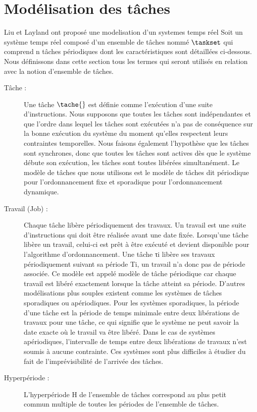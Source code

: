 \section{Modélisation des tâches}
\vspace{-1cm}
Liu et Layland \cite{LL73} ont proposé une modelisation d'un systemes temps réel 
Soit un système temps réel composé d’un ensemble de tâches nommé $\taskset$ qui comprend n tâches périodiques dont les caractéristiques sont détaillées ci-dessous. Nous définissons dans cette section tous les termes qui seront utilisés en relation avec la notion d’ensemble de tâches.
\begin{description}
\item[Tâche :] Une tâche $\tache{}$ est définie comme l’exécution d’une suite d’instructions. Nous supposons que toutes les tâches sont indépendantes et que l’ordre dans lequel les tâches sont exécutées n’a pas de conséquence sur la bonne exécution du système du moment qu’elles respectent leurs contraintes temporelles. Nous faisons également l’hypothèse que les tâches sont synchrones, donc que toutes les tâches sont actives dès que le système débute son exécution, les tâches sont toutes libérées simultanément. Le modèle de tâches que nous utilisons est le modèle de tâches dit périodique pour l’ordonnancement fixe et sporadique pour l’ordonnancement dynamique.
\item[Travail (Job) :] Chaque tâche libère périodiquement des travaux. Un travail est une suite d’instructions qui doit être réalisée avant une date fixée. Lorsqu’une tâche libère un travail, celui-ci est prêt à être exécuté et devient disponible pour l’algorithme d’ordonnancement. Une tâche τi libère ses travaux périodiquement suivant sa période Ti, un travail n’a donc pas de période associée. Ce modèle est appelé modèle de tâche périodique car chaque travail est libéré exactement lorsque la tâche atteint sa période. D’autres modélisations plus souples existent comme les systèmes de tâches sporadiques ou apériodiques. Pour les systèmes sporadiques, la période d’une tâche est la période de temps minimale entre deux libérations de travaux pour une tâche, ce qui signifie que le système ne peut savoir la date exacte où le travail va être libéré. Dans le cas de systèmes apériodiques, l’intervalle de temps entre deux libérations de travaux n’est soumis à aucune contrainte. Ces systèmes sont plus diﬃciles à étudier du fait de l’imprévisibilité de l’arrivée des tâches. 
\item[Hyperpériode :] L’hyperpériode H de l’ensemble de tâches correspond au plus petit commun multiple de toutes les périodes de l’ensemble de tâches.

\end{description}
